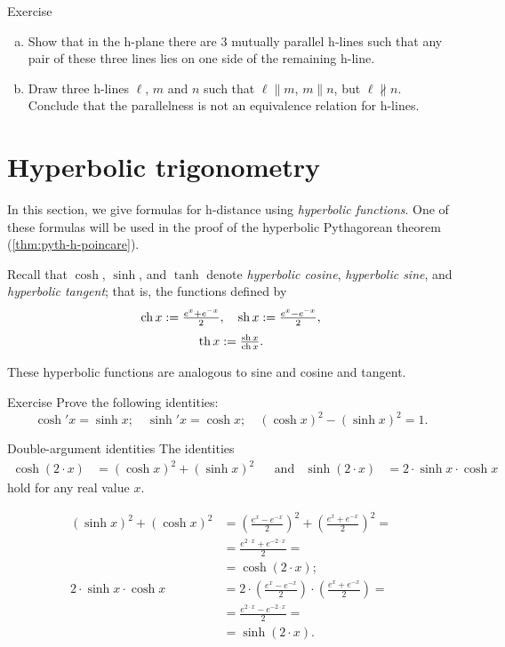 \begin{thm}{Exercise}\label{ex:3-h-lines}
\begin{enumerate}[(a)]
\item Show that in the h-plane there are 3 mutually parallel h-lines 
such that any pair of these three lines lies on one side of the remaining h-line.
\item Draw three h-lines $\ell$, $m$ and $n$ such that $\ell\parallel m$, $m\parallel n$, but $\ell\nparallel n$.
Conclude that the parallelness is not an equivalence relation for h-lines.
\end{enumerate}
\end{thm}
 
\section{Hyperbolic trigonometry}
\label{sec:hyp-trig}


In this section, we give formulas for h-distance using \emph{hyperbolic functions}.
One of these formulas will be used in the proof of the hyperbolic Pythagorean theorem (\ref{thm:pyth-h-poincare}).

Recall that $\cosh$, $\sinh$, and $\tanh$ denote \emph{hyperbolic cosine}, \emph{hyperbolic sine}, and \emph{hyperbolic tangent}\label{hyperbolic tangent};
that is, the functions defined by
\[\operatorname{ch} x:= \tfrac{e^x+e^{-x}}2,
 \quad
 \operatorname{sh} x:= \tfrac{e^x-e^{-x}}2,
\]
\[\operatorname{th} x:= \tfrac{\operatorname{sh} x}{\operatorname{ch} x}.
\]

These hyperbolic functions are analogous to sine and cosine and tangent. 

\begin{thm}{Exercise}\label{ex:hyp-fun}
Prove the following identities:
\[\cosh' x=\sinh x;\quad \sinh'x=\cosh x;\quad (\cosh x)^2-(\sinh x)^2=1.\]
\end{thm}

\begin{thm}{Double-argument identities}\label{double-argument}
The identities
\begin{align*}
\cosh (2\cdot x)&=(\cosh x)^2+(\sinh x)^2 
&&\text{and}&
\sinh (2\cdot x)&=2\cdot\sinh x\cdot \cosh x
\end{align*}
hold for any real value $x$.
\end{thm}

\begin{align*}
(\sinh x)^2+(\cosh x)^2
&=(\tfrac{e^x-e^{-x}}2)^2+(\tfrac{e^x+e^{-x}}2)^2=
\\
&=\tfrac{e^{2\cdot x}+e^{-2\cdot x}}2=
\\
&=\cosh (2\cdot x);
\\
2\cdot\sinh x\cdot \cosh x
&=2\cdot(\tfrac{e^x-e^{-x}}2)\cdot(\tfrac{e^x+e^{-x}}2)=
\\
&=\tfrac{e^{2\cdot x}-e^{-2\cdot x}}2=
\\
&=\sinh (2\cdot x).
\end{align*}
\qedsf

